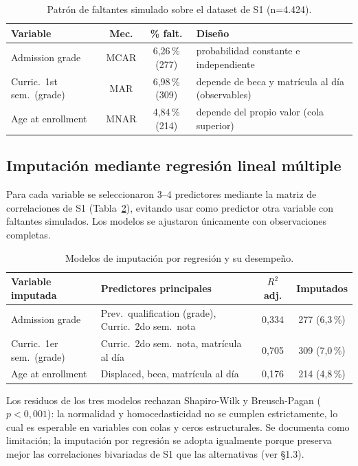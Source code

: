 \documentclass[11pt,a4paper]{article}
\begin{document}
\begin{table}[h]
\centering
\small
\begin{tabular}{@{}p{4.1cm}ccp{5.4cm}@{}}
\toprule
Variable & Mec. & \% falt. & Diseño \\
\midrule
Admission grade & MCAR & 6{,}26\,\% (277) & probabilidad constante e independiente \\
Curric.\ 1st sem.\ (grade) & MAR & 6{,}98\,\% (309) & depende de beca y matrícula al día (observables) \\
Age at enrollment & MNAR & 4{,}84\,\% (214) & depende del propio valor (cola superior) \\
\bottomrule
\end{tabular}
\caption{Patrón de faltantes simulado sobre el dataset de S1 (n=4.424).}
\label{tab:faltantes}
\end{table}

\subsection{Imputación mediante regresión lineal múltiple}

Para cada variable se seleccionaron 3--4 predictores mediante la matriz de correlaciones de S1
(Tabla~\ref{tab:imputacion}), evitando usar como predictor otra variable con faltantes simulados.
Los modelos se ajustaron únicamente con observaciones completas.

\begin{table}[h]
\centering
\small
\begin{tabular}{@{}p{3.6cm}p{6.0cm}cc@{}}
\toprule
Variable imputada & Predictores principales & $R^2$ adj. & Imputados \\
\midrule
Admission grade & Prev.\ qualification (grade), Curric.\ 2do sem.\ nota & 0{,}334 & 277 (6{,}3\,\%) \\
Curric.\ 1er sem.\ (grade) & Curric.\ 2do sem.\ nota, matrícula al día & 0{,}705 & 309 (7{,}0\,\%) \\
Age at enrollment & Displaced, beca, matrícula al día & 0{,}176 & 214 (4{,}8\,\%) \\
\bottomrule
\end{tabular}
\caption{Modelos de imputación por regresión y su desempeño.}
\label{tab:imputacion}
\end{table}

Los residuos de los tres modelos rechazan Shapiro-Wilk y Breusch-Pagan ($p<0{,}001$): la
normalidad y homocedasticidad no se cumplen estrictamente, lo cual es esperable en variables con
colas y ceros estructurales. Se documenta como limitación; la imputación por regresión se adopta
igualmente porque preserva mejor las correlaciones bivariadas de S1 que las alternativas (ver
\S1.3).
\end{document}
